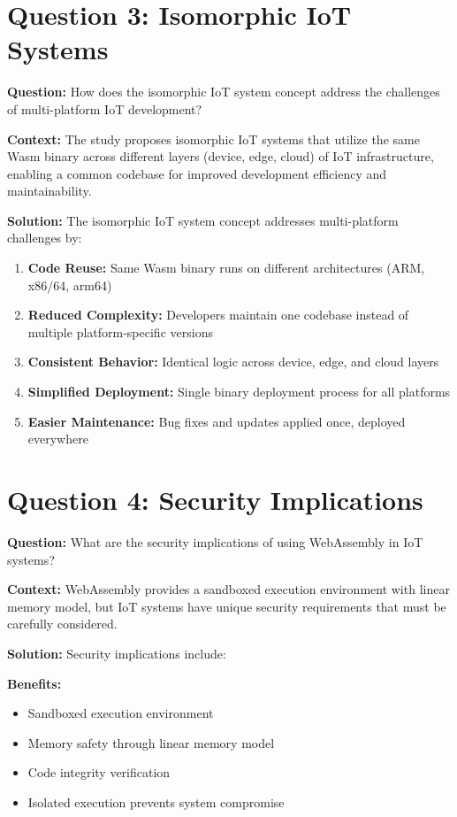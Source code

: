 \documentclass[11pt]{article}
\begin{document}
\newpage

\section*{Question 3: Isomorphic IoT Systems}

\textbf{Question:} How does the isomorphic IoT system concept address the challenges of multi-platform IoT development?

\textbf{Context:} The study proposes isomorphic IoT systems that utilize the same Wasm binary across different layers (device, edge, cloud) of IoT infrastructure, enabling a common codebase for improved development efficiency and maintainability.

\textbf{Solution:} The isomorphic IoT system concept addresses multi-platform challenges by:

\begin{enumerate}[label=\arabic*.]
\item \textbf{Code Reuse:} Same Wasm binary runs on different architectures (ARM, x86/64, arm64)
\item \textbf{Reduced Complexity:} Developers maintain one codebase instead of multiple platform-specific versions
\item \textbf{Consistent Behavior:} Identical logic across device, edge, and cloud layers
\item \textbf{Simplified Deployment:} Single binary deployment process for all platforms
\item \textbf{Easier Maintenance:} Bug fixes and updates applied once, deployed everywhere
\end{enumerate}

\section*{Question 4: Security Implications}

\textbf{Question:} What are the security implications of using WebAssembly in IoT systems?

\textbf{Context:} WebAssembly provides a sandboxed execution environment with linear memory model, but IoT systems have unique security requirements that must be carefully considered.

\textbf{Solution:} Security implications include:

\textbf{Benefits:}
\begin{itemize}
\item Sandboxed execution environment
\item Memory safety through linear memory model
\item Code integrity verification
\item Isolated execution prevents system compromise
\end{itemize}
\end{document}

